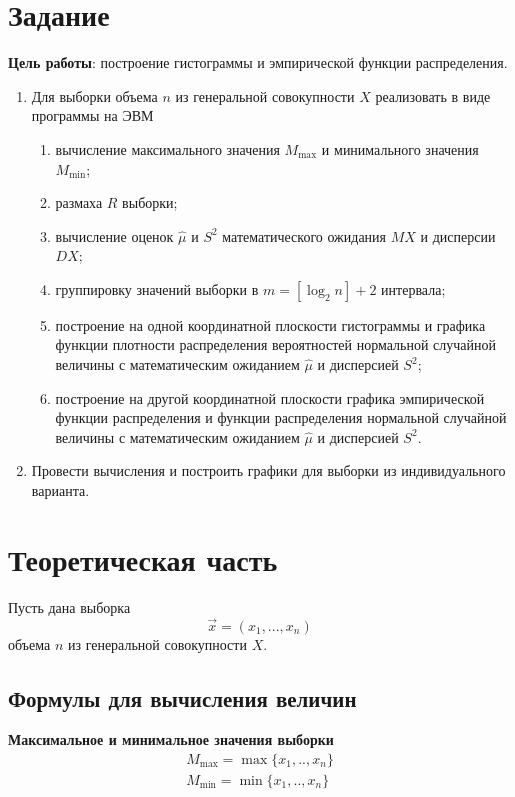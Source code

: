 \chapter{Задание}

\textbf{Цель работы}: построение гистограммы и эмпирической функции распределения.

\begin{enumerate}
	\item Для выборки объема $n$ из генеральной совокупности $X$ реализовать в виде программы на ЭВМ
		\begin{enumerate}
			\item вычисление максимального значения $M_{\max}$ и минимального значения $M_{\min}$;
			\item размаха $R$ выборки;
			\item вычисление оценок $\hat\mu$ и $S^2$ математического ожидания $MX$ и дисперсии $DX$;
			\item группировку значений выборки в $m = [\log_2 n] + 2$ интервала;
			\item построение на одной координатной плоскости гистограммы и графика функции плотности распределения вероятностей нормальной случайной величины с математическим
ожиданием $\hat\mu$ и дисперсией $S^2$;
			\item построение на другой координатной плоскости графика эмпирической функции распределения и функции распределения нормальной случайной величины с математическим
ожиданием $\hat\mu$ и дисперсией $S^2$.
		\end{enumerate}
	\item Провести вычисления и построить графики для выборки из индивидуального варианта.
\end{enumerate}

\chapter{Теоретическая часть}

Пусть дана выборка $$\vec x=(x_1, ..., x_n)$$ объема $n$ из генеральной совокупности $X$.

\section{Формулы для вычисления величин}

\textbf{Максимальное и минимальное значения выборки}
\begin{equation}
    \begin{aligned}
        M_{\max} = \max\{x_1, .., x_n\}\\
        M_{\min} = \min\{x_1, .., x_n\}
    \end{aligned}
\end{equation}

